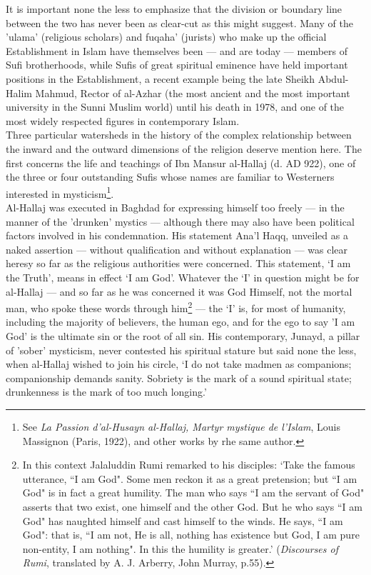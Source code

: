 \documentclass[10pt, twoside,openright]{book}
\begin{document}
It is important none the less to emphasize that the division or boundary line between the two has 
never been as clear\hyp{}cut as this might suggest. Many of the 'ulama' (religious scholars) and fuqaha' 
(jurists) who make up the official Establishment in Islam have themselves been --- and are today --- 
members of Sufi brotherhoods, while Sufis of great spiritual eminence have held important positions 
in the Establishment, a recent example being the late Sheikh Abdul\hyp{}Halim Mahmud, Rector of al\hyp{}Azhar 
(the most ancient and the most important university in the Sunni Muslim world) until his death in 
1978, and one of the most widely respected figures in contemporary Islam. \\

Three particular watersheds in the history of the complex relationship between the inward and the 
outward dimensions of the religion deserve mention here. The first concerns the life and teachings of 
Ibn Mansur al\hyp{}Hallaj (d. AD 922), one of the three or four outstanding Sufis whose names are familiar 
to Westerners interested in mysticism\footnote{See \emph{La Passion d'al\hyp{}Husayn al\hyp{}Hallaj, Martyr mystique de l'Islam}, Louis Massignon (Paris, 1922), and other works by rhe same author.}.\\

Al-Hallaj was executed in Baghdad for expressing himself too freely --- in the manner of the 'drunken' 
mystics --- although there may also have been political factors involved in his condemnation. His 
statement Ana'l Haqq, unveiled as a naked assertion --- without qualification and without explanation --- 
was clear heresy so far as the religious authorities were concerned. This statement, `I am the 
Truth', means in effect `I am God'. Whatever the `I' in question might be for al-Hallaj --- and so far 
as he was concerned it was God Himself, not the mortal man, who spoke these words through him\footnote{In this context Jalaluddin Rumi remarked to his disciples: `Take the famous utterance, ``I am God". Some men reckon it as a great pretension; but ``I am God" is in fact a great humility. The man who 
says ``I am the servant of God" asserts that two exist, one himself and the other God. But he who says 
``I am God" has naughted himself and cast himself to the winds. He says, ``I am God": that is, ``I am 
not, He is all, nothing has existence but God, I am pure non\hyp{}entity, I am nothing". In this the 
humility is greater.' (\emph{Discourses of Rumi}, translated by A. J. Arberry, John Murray, p.55).} --- 
the `I' is, for most of humanity, including the majority of believers, the human ego, and for the ego 
to say 'I am God' is the ultimate sin or the root of all sin. His contemporary, Junayd, a pillar of 
'sober' mysticism, never contested his spiritual stature but said none the less, when al\hyp{}Hallaj 
wished to join his circle, `I do not take madmen as companions; companionship demands sanity. 
Sobriety is the mark of a sound spiritual state; drunkenness is the mark of too much longing.' \\
\end{document}
